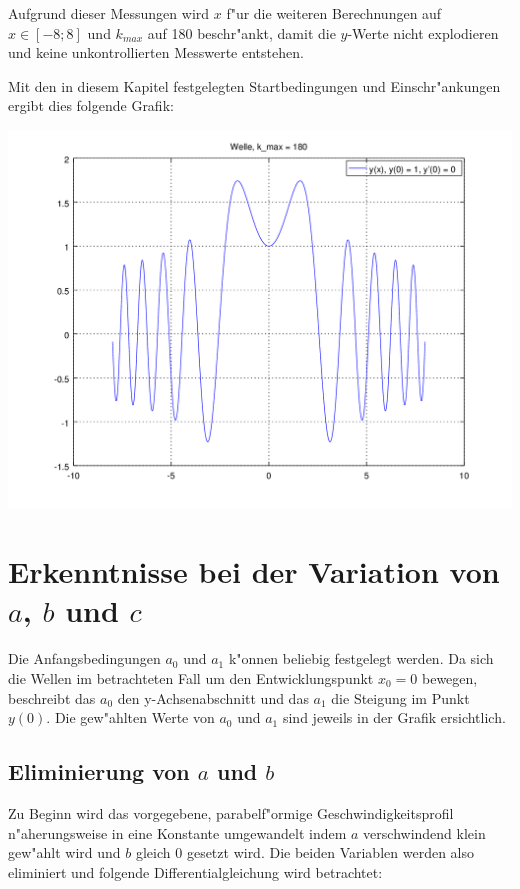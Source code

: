 \begin{refsection}
Aufgrund dieser Messungen wird $x$ f"ur die weiteren Berechnungen auf $x \in 
[-8;8]$ und $k_{max}$ auf 180 beschr"ankt, damit die $y$-Werte nicht 
explodieren und keine unkontrollierten Messwerte entstehen.

Mit den in diesem Kapitel festgelegten Startbedingungen und Einschr"ankungen 
ergibt dies folgende Grafik:
\begin{center}
	\includegraphics[scale=0.5]{./wellen/octave/images/kmax/ak180-88wave.png}
\end{center}

\section{Erkenntnisse bei der Variation von \texorpdfstring{$a$}{a}, 
\texorpdfstring{$b$}{b} und \texorpdfstring{$c$}{c}}

Die Anfangsbedingungen $a_0$ und $a_1$ k"onnen beliebig festgelegt werden. Da 
sich die Wellen im betrachteten Fall um den Entwicklungspunkt $x_0=0$ bewegen, 
beschreibt das $a_0$ den y-Achsenabschnitt und das $a_1$ die Steigung im Punkt 
$y(0)$. Die gew"ahlten Werte von $a_0$ und $a_1$ sind jeweils in der Grafik 
ersichtlich.

\subsection{Eliminierung von $a$ und $b$}
\label{wellen:Eliminierungab}

Zu Beginn wird das vorgegebene, parabelf"ormige Geschwindigkeitsprofil 
n"aherungsweise in eine Konstante umgewandelt indem $a$ verschwindend klein 
gew"ahlt wird und $b$ gleich $0$ gesetzt wird. Die beiden Variablen werden also 
eliminiert und folgende Differentialgleichung wird betrachtet:


\end{refsection}
